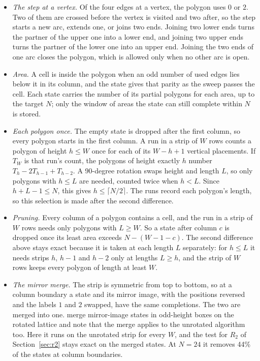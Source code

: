 \documentclass[11pt]{a000104}
\numberwithin{equation}{section}
\begin{document}
\begin{itemize}
  \item \emph{The step at a vertex.} Of the four edges at a vertex, the polygon uses $0$ or $2$. Two of them are crossed before the vertex is visited and two after, so the step starts a new arc, extends one, or joins two ends. Joining two lower ends turns the partner of the upper one into a lower end, and joining two upper ends turns the partner of the lower one into an upper end. Joining the two ends of one arc closes the polygon, which is allowed only when no other arc is open.
  \item \emph{Area.} A cell is inside the polygon when an odd number of used edges lies below it in its column, and the state gives that parity as the sweep passes the cell. Each state carries the number of its partial polygons for each area, up to the target $N$; only the window of areas the state can still complete within $N$ is stored.
  \item \emph{Each polygon once.} The empty state is dropped after the first column, so every polygon starts in the first column. A run in a strip of $W$ rows counts a polygon of height $h \le W$ once for each of its $W - h + 1$ vertical placements. If $T_W$ is that run's count, the polygons of height exactly $h$ number $T_h - 2T_{h-1} + T_{h-2}$. A 90-degree rotation swaps height and length $L$, so only polygons with $h \le L$ are needed, counted twice when $h < L$. Since $h + L - 1 \le N$, this gives $h \le \lceil N/2 \rceil$. The runs record each polygon's length, so this selection is made after the second difference.
  \item \emph{Pruning.} Every column of a polygon contains a cell, and the run in a strip of $W$ rows needs only polygons with $L \ge W$. So a state after column $c$ is dropped once its least area exceeds $N - (W - 1 - c)$. The second difference above stays exact because it is taken at each length $L$ separately: for $h \le L$ it needs strips $h$, $h - 1$ and $h - 2$ only at lengths $L \ge h$, and the strip of $W$ rows keeps every polygon of length at least $W$.
  \item \emph{The mirror merge.} The strip is symmetric from top to bottom, so at a column boundary a state and its mirror image, with the positions reversed and the labels $1$ and $2$ swapped, have the same completions. The two are merged into one. \textcite[Sect.~4.3]{BarequetBenShachar:2026} merge mirror-image states in odd-height boxes on the rotated lattice and note that the merge applies to the unrotated algorithm too. Here it runs on the unrotated strip for every $W$, and the test for $R_2$ of Section~\ref{sec:r2} stays exact on the merged states. At $N = 24$ it removes 44\% of the states at column boundaries.
\end{itemize}
\end{document}
